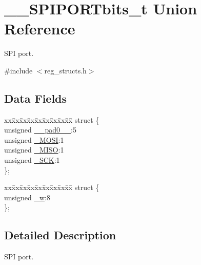 \hypertarget{union_____s_p_i_p_o_r_tbits__t}{\section{\-\_\-\-\_\-\-S\-P\-I\-P\-O\-R\-Tbits\-\_\-t Union Reference}
\label{union_____s_p_i_p_o_r_tbits__t}
}


S\-P\-I port.  




{\ttfamily \#include $<$reg\-\_\-structs.\-h$>$}

\subsection*{Data Fields}
\begin{DoxyCompactItemize}
\item 
\begin{tabbing}
xx\=xx\=xx\=xx\=xx\=xx\=xx\=xx\=xx\=\kill
struct \{\\
\>unsigned \hyperlink{union_____s_p_i_p_o_r_tbits__t_adaa7058ebdf3984a666270efbbd35783}{\_\_pad0\_\_}:5\\
\>unsigned \hyperlink{union_____s_p_i_p_o_r_tbits__t_aad271e40e94776c0c0b4c69573527867}{\_MOSI}:1\\
\>unsigned \hyperlink{union_____s_p_i_p_o_r_tbits__t_a495a90d64370d78287cb8ab826e3822e}{\_MISO}:1\\
\>unsigned \hyperlink{union_____s_p_i_p_o_r_tbits__t_af5db81645a0530bcbb7321f2e5664209}{\_SCK}:1\\
\}; \\

\end{tabbing}\item 
\begin{tabbing}
xx\=xx\=xx\=xx\=xx\=xx\=xx\=xx\=xx\=\kill
struct \{\\
\>unsigned \hyperlink{union_____s_p_i_p_o_r_tbits__t_abb3fb2027795720ba0463bb2859499dc}{\_w}:8\\
\}; \\

\end{tabbing}\end{DoxyCompactItemize}


\subsection{Detailed Description}
S\-P\-I port. 

